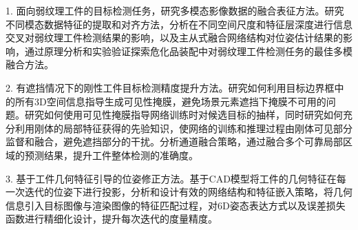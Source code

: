 \documentclass[12pt]{article}
\begin{document}
1. 面向弱纹理工件的目标检测任务，研究多模态影像数据的融合表征方法。研究不同模态数据特征的提取和对齐方法，分析在不同空间尺度和特征层深度进行信息交叉对弱纹理工件检测结果的影响，以及主从式融合网络结构对位姿估计结果的影响，通过原理分析和实验验证探索危化品装配中对弱纹理工件检测任务的最佳多模融合方法。




2. 有遮挡情况下的刚性工件目标检测精度提升方法。研究如何利用目标边界框中的所有3D空间信息指导生成可见性掩膜，避免场景元素遮挡下掩膜不可用的问题。研究如何使用可见性掩膜指导网络训练时对候选目标的抽样，同时研究如何充分利用刚体的局部特征获得的先验知识，使网络的训练和推理过程由刚体可见部分监督和融合，避免遮挡部分的干扰。分析通道融合策略，通过融合多个可靠局部区域的预测结果，提升工件整体检测的准确度。




3. 基于工件几何特征引导的位姿修正方法。基于CAD模型将工件的几何特征在每一次迭代的位姿下进行投影，分析和设计有效的网络结构和特征嵌入策略，将几何信息引入目标图像与渲染图像的特征匹配过程，对6D姿态表达方式以及误差损失函数进行精细化设计，提升每次迭代的度量精度。
\end{document}
